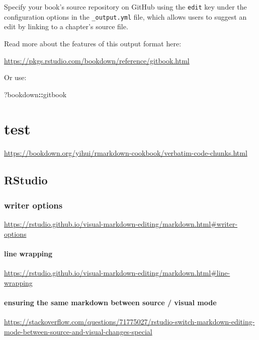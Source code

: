 \documentclass[
]{book}
\newenvironment{Shaded}{\begin{snugshade}}{\end{snugshade}}
\newcommand{\NormalTok}[1]{#1}
\newcommand{\SpecialCharTok}[1]{\textcolor[rgb]{0.81,0.36,0.00}{\textbf{#1}}}
\theoremstyle{definition}
\theoremstyle{definition}
\theoremstyle{definition}
\theoremstyle{definition}
\theoremstyle{remark}
\begin{document}
Specify your book's source repository on GitHub using the \texttt{edit} key under the configuration options in the \texttt{\_output.yml} file, which allows users to suggest an edit by linking to a chapter's source file.

Read more about the features of this output format here:

\url{https://pkgs.rstudio.com/bookdown/reference/gitbook.html}

Or use:

\begin{Shaded}
\begin{Highlighting}[]
\NormalTok{?bookdown}\SpecialCharTok{::}\NormalTok{gitbook}
\end{Highlighting}
\end{Shaded}

\chapter{test}\label{test}

\url{https://bookdown.org/yihui/rmarkdown-cookbook/verbatim-code-chunks.html}

\section{RStudio}\label{rstudio}

\subsection{writer options}\label{writer-options}

\url{https://rstudio.github.io/visual-markdown-editing/markdown.html\#writer-options}

\subsubsection{line wrapping}\label{line-wrapping}

\url{https://rstudio.github.io/visual-markdown-editing/markdown.html\#line-wrapping}

\subsubsection{ensuring the same markdown between source / visual mode}\label{ensuring-the-same-markdown-between-source-visual-mode}

\url{https://stackoverflow.com/questions/71775027/rstudio-switch-markdown-editing-mode-between-source-and-visual-changes-special}
\end{document}
